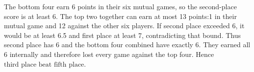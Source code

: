 The bottom four earn 6 points in their six mutual games, so the second-place score is at least 6. The top two together can earn at most 13 points:1 in their mutual game and 12 against the other six players. If second place exceeded 6, it would be at least 6.5 and first place at least 7, contradicting that bound. Thus second place has 6 and the bottom four combined have exactly 6. They earned all 6 internally and therefore lost every game against the top four. Hence $\boxed{\text{third place beat fifth place}}$.
